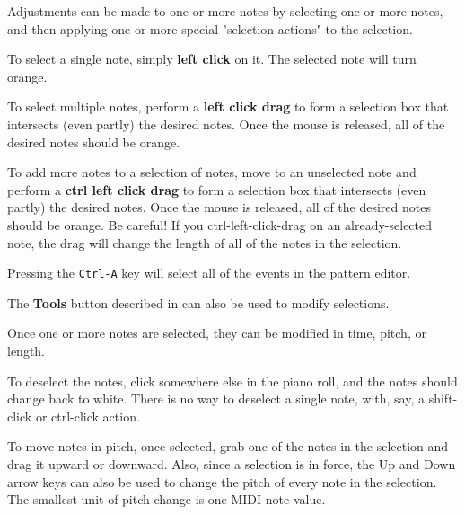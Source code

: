    Adjustments can be made to one or more notes by selecting one or more notes,
   and then applying one or more special
    "selection actions" to the selection.

   To select a single note, simply \textbf{left click} on it.
   The selected note will turn orange.

   To select multiple notes, perform a \textbf{left click drag}
   to form a selection box that intersects (even partly) the desired notes.
   Once the mouse is released, all of the desired notes should be orange.

   To add more notes to a selection of notes, move to an unselected note
   and perform a \textbf{ctrl left click drag}
   to form a selection box that intersects (even partly) the desired notes.
   Once the mouse is released, all of the desired notes should be orange.
   Be careful!  If you ctrl-left-click-drag on an already-selected note,
   the drag will change the length of all of the notes in the selection.

   Pressing the \texttt{Ctrl-A} key will select all of the events in the
   pattern editor.

   The \textbf{Tools} button described in
    can also be used to
   modify selections.

   Once one or more notes are selected, they can be modified in time,
   pitch, or length.

   To deselect the notes, click somewhere else in the piano roll, and the notes
   should change back to white.
   There is no way to deselect a single note, with, say, a shift-click
   or ctrl-click action.


   To move notes in pitch, once selected, grab one of the notes in the
   selection and drag it upward or downward.
   Also, since a selection is in force, the Up and Down arrow keys can also
   be used to change the pitch of every note in the selection.
   The smallest unit of pitch change is one MIDI note value.

